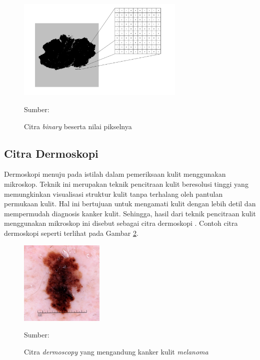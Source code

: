     \begin{figure}[H]
        \begin{center}
            \includegraphics[width=8cm]{../img/Citra Biner - Latex.png}
            \caption{Citra \textit{binary} beserta nilai pikselnya}
            \label{fig:binary}
            Sumber: \citep{Kusumanto2011}
        \end{center}
    \end{figure}

    \subsection{Citra Dermoskopi}
    Dermoskopi menuju pada istilah dalam pemeriksaan kulit menggunakan mikroskop. Teknik ini merupakan teknik pencitraan kulit beresolusi tinggi yang memungkinkan visualisasi struktur kulit tanpa terhalang oleh pantulan permukaan kulit. Hal ini bertujuan untuk mengamati kulit dengan lebih detil dan mempermudah diagnosis kanker kulit. Sehingga, hasil dari teknik pencitraan kulit menggunakan mikroskop ini disebut sebagai citra dermoskopi \citep{Celebi2019}. Contoh citra dermoskopi seperti terlihat pada Gambar \ref{fig:dermoscopy}.

    \begin{figure}[H]
        \begin{center}
            \includegraphics[width=4cm]{../img/Dermoscopy - Latex.jpg}
            \caption{Citra \textit{dermoscopy} yang mengandung kanker kulit \textit{melanoma}}
            \label{fig:dermoscopy}
            Sumber: \citep{Nersisson2021a}
        \end{center}
    \end{figure}

